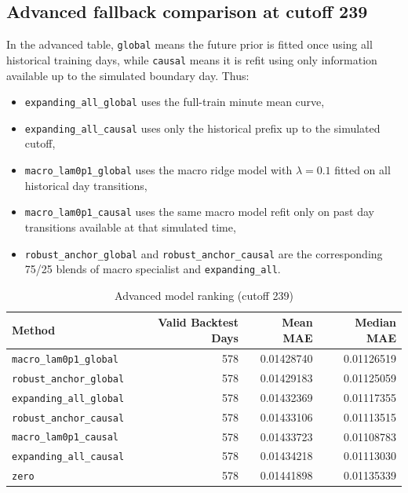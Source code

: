\subsection{Advanced fallback comparison at cutoff 239}
In the advanced table, \texttt{global} means the future prior is fitted once using all historical training days, while \texttt{causal} means it is refit using only information available up to the simulated boundary day. Thus:
\begin{itemize}[leftmargin=1.5em]
  \item \texttt{expanding\_all\_global} uses the full-train minute mean curve,
  \item \texttt{expanding\_all\_causal} uses only the historical prefix up to the simulated cutoff,
  \item \texttt{macro\_lam0p1\_global} uses the macro ridge model with $\lambda=0.1$ fitted on all historical day transitions,
  \item \texttt{macro\_lam0p1\_causal} uses the same macro model refit only on past day transitions available at that simulated time,
  \item \texttt{robust\_anchor\_global} and \texttt{robust\_anchor\_causal} are the corresponding 75/25 blends of macro specialist and \texttt{expanding\_all}.
\end{itemize}
\begin{table}[h]
\centering
\caption{Advanced model ranking (cutoff 239)}
\begin{tabular}{lrrr}
\toprule
Method & Valid Backtest Days & Mean MAE & Median MAE \\
\midrule
\texttt{macro\_lam0p1\_global}      & 578 & 0.01428740 & 0.01126519 \\
\texttt{robust\_anchor\_global}     & 578 & 0.01429183 & 0.01125059 \\
\texttt{expanding\_all\_global}     & 578 & 0.01432369 & 0.01117355 \\
\texttt{robust\_anchor\_causal}     & 578 & 0.01433106 & 0.01113515 \\
\texttt{macro\_lam0p1\_causal}      & 578 & 0.01433723 & 0.01108783 \\
\texttt{expanding\_all\_causal}     & 578 & 0.01434218 & 0.01113030 \\
\texttt{zero}                       & 578 & 0.01441898 & 0.01135339 \\
\bottomrule
\end{tabular}
\end{table}

